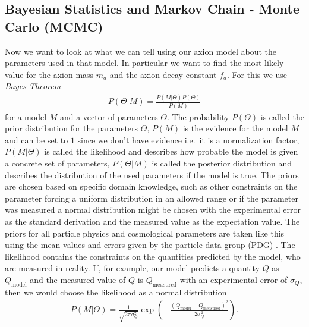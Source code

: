\documentclass[twoside,a4paper, 12pt]{article}
\numberwithin{equation}{section}
\begin{document}
\subsection{Bayesian Statistics and Markov Chain - Monte Carlo (MCMC)}
\label{sec:mcmc}
Now we want to look at what we can tell using our axion model about the parameters used in that model.
In particular we want to find the most likely value for the axion mass $m_a$ and the axion decay constant $f_a$.
For this we use \emph{Bayes Theorem} \cite[Sec. 1.4]{ThinkBayes}
\begin{align}
    \label{eq:bayes}
    P(\Theta | M) = \frac{P(M | \Theta) P(\Theta)}{P(M)}
\end{align}
for a model $M$ and a vector of parameters $\Theta$.
The probability $P(\Theta)$ is called the prior distribution for the parameters $\Theta$,
$P(M)$ is the evidence for the model $M$ and can be set to $1$ since we don't have evidence i.e.\ it is a
normalization factor, $P(M | \Theta)$ is called the likelihood and describes how probable the model is
given a concrete set of parameters, $P(\Theta| M)$ is called the posterior distribution and describes
the distribution of the used parameters if the model is true.
The priors are chosen based on specific domain knowledge, such as other constraints on the parameter forcing a
uniform distribution in an allowed range or if the parameter was measured a normal distribution might be chosen
with the experimental error as the standard derivation and the measured value as the expectation value.
The priors for all particle physics and cosmological parameters are taken like this using the mean values and errors given by the particle data group (PDG) \cite{PDG}.
The likelihood contains the constraints on the quantities predicted by the model, who are measured in reality.
If, for example, our model predicts a quantity $Q$ as $Q_\mathrm{model}$ and the measured value of $Q$ is $Q_\mathrm{measured}$
with an experimental error of $\sigma_Q$, then we would choose the likelihood as a normal distribution
\begin{align*}
    P(M | \Theta) = \frac{1}{\sqrt{2 \pi \sigma_Q^2}} \exp { \left( - \frac{(Q_\mathrm{model} - Q_\mathrm{measured})^2}{2 \sigma_Q^2} \right) }.
\end{align*}
\end{document}
